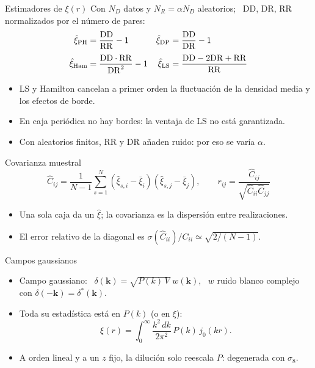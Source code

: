 \documentclass[aspectratio=169]{beamer}
\newcommand{\DD}{\mathrm{DD}}
\newcommand{\DR}{\mathrm{DR}}
\newcommand{\RR}{\mathrm{RR}}
\begin{document}
\begin{frame}{Estimadores de $\xi(r)$}
  Con $N_D$ datos y $N_R=\alpha N_D$ aleatorios; \ DD, DR, RR normalizados por el número de pares:
  \begin{align*}
    \hat\xi_{\rm PH}  &= \frac{\DD}{\RR}-1 &
    \hat\xi_{\rm DP}  &= \frac{\DD}{\DR}-1\\[0.3em]
    \hat\xi_{\rm Ham} &= \frac{\DD\cdot\RR}{\DR^2}-1 &
    \hat\xi_{\rm LS}  &= \frac{\DD-2\DR+\RR}{\RR}
  \end{align*}
  \begin{itemize}
    \item LS y Hamilton cancelan a primer orden la fluctuación de la densidad media y los efectos de borde.
    \item En caja periódica no hay bordes: la ventaja de LS no está garantizada.
    \item Con aleatorios finitos, $\RR$ y $\DR$ añaden ruido: por eso se varía $\alpha$.
  \end{itemize}
\end{frame}

\begin{frame}{Covarianza muestral}
  \[
    \hat C_{ij} = \frac{1}{N-1}\sum_{s=1}^{N}
    (\hat\xi_{s,i}-\bar\xi_i)(\hat\xi_{s,j}-\bar\xi_j),
    \qquad
    r_{ij} = \frac{\hat C_{ij}}{\sqrt{\hat C_{ii}\hat C_{jj}}}
  \]
  \begin{itemize}
    \setlength\itemsep{0.6em}
    \item Una sola caja da un $\hat\xi$; la covarianza es la dispersión entre realizaciones.
    \item El error relativo de la diagonal es $\sigma(\hat C_{ii})/C_{ii}\simeq\sqrt{2/(N-1)}$.
  \end{itemize}
\end{frame}

\begin{frame}{Campos gaussianos}
  \begin{itemize}
    \setlength\itemsep{0.8em}
    \item Campo gaussiano: \
      $\delta(\mathbf k) = \sqrt{P(k)\,V}\;w(\mathbf k)$, \ $w$ ruido blanco complejo con
      $\delta(-\mathbf k)=\delta^*(\mathbf k)$.
    \item Toda su estadística está en $P(k)$ (o en $\xi$):
      \[
        \xi(r) = \int_0^\infty \frac{k^2\,dk}{2\pi^2}\,P(k)\,j_0(kr).
      \]
    \item A orden lineal y a un $z$ fijo, la dilución solo reescala $P$: degenerada con $\sigma_8$.
  \end{itemize}
\end{frame}
\end{document}
